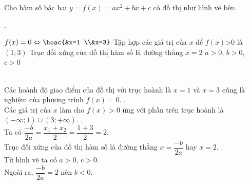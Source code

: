 \begin{ex}%
Cho hàm số bậc hai $y=f(x)=ax^2+bx+c$ có đồ thị như hình vẽ bên.
\begin{center}
.\\
\end{center}
\choiceTF
{\True $f(x)=0\Leftrightarrow \hoac{&x=1 \\&x=3}$}
{Tập hợp các giá trị của $x$ để $f(x)$>0 là $(1;3)$}
{\True Trục đối xứng của đồ thị hàm số là đường thẳng $x=2$}
{$a>0$, $b>0$, $c>0$}
\loigiai
{\begin{itemchoice}
.\\
Các hoành độ giao điểm của đồ thị với trục hoành là $x=1$ và $x=3$ cũng là nghiệm của phương trình $f(x)=0$.
.\\
Các giá trị của $x$ làm cho $f(x)>0$ ứng với phần trên trục hoành là $(-\infty;1)\cup (3;+\infty)$.
.\\
Ta có $\dfrac{-b}{2a}=\dfrac{x_1 + x_2}{2}=\dfrac{1+3}{2}=2$.\\
Trục đối xứng của đồ thị hàm số là đường thẳng $x=\dfrac{-b}{2a}$ hay $x=2$.
.\\
Từ hình vẽ ta có $a>0$, $c>0$.\\
Ngoài ra, $\dfrac{-b}{2a}=2$ nên $b<0$.
\end{itemchoice}}
\end{ex}

